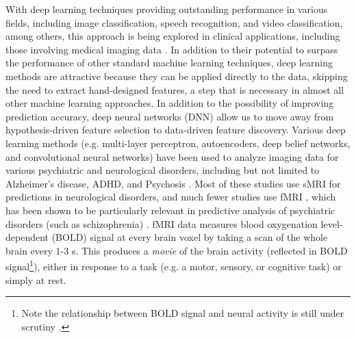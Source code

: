 \documentclass{article}
\begin{document}
With deep learning techniques providing outstanding performance in various fields, including image classification, speech recognition, and video classification, among others, this approach is being explored in clinical applications, including those involving medical imaging data \citep{Shen2017, Litjens2017, Gulshan2016}. In addition to their potential to surpass the performance of other standard machine learning techniques, deep learning  methods are attractive because they can be applied directly to the data, skipping the need to extract hand-designed features, a step that is necessary in almost all other machine learning approaches. In addition to the possibility of improving prediction accuracy, deep neural networks (DNN) allow us to move away from hypothesis-driven feature selection to data-driven feature discovery.
Various deep learning methods (e.g. multi-layer perceptron, autoencoders, deep belief networks, and convolutional neural networks) have been used to analyze imaging data for various psychiatric and neurological disorders, including but not limited to Alzheimer's disease, ADHD, and Psychosis \citep[see][for a review]{Vieira2017}. Most of these studies use sMRI for predictions in neurological disorders, and much fewer studies use fMRI \citep{Plis2014, Kim2016, Suk2016, Sarraf2016}, which has been shown to be particularly relevant in predictive analysis of psychiatric disorders (such as schizophrenia) \citep{Damaraju2014, Calhoun2009}. fMRI data measures blood oxygenation level-dependent (BOLD) signal at every brain voxel by taking a scan of the whole brain every 1-3 s. This produces a \textit{movie} of the brain activity (reflected in BOLD signal\footnote{Note the relationship between BOLD signal and neural activity is still under scrutiny \citep{RN1}.}), either in response to a task (e.g. a motor, sensory, or cognitive task) or simply at rest.

\end{document}
